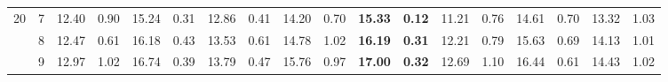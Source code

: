 \documentclass[conference]{IEEEtran}
\begin{document}
\begin{table}[t]
\begin{tabular}{|cc|ll|ll|ll|ll|ll|ll|ll|ll|}
		\multicolumn{1}{|c|}{\multirow{3}{*}{20}} & 7          & \multicolumn{1}{l|}{12.40}         & 0.90                              & \multicolumn{1}{l|}{15.24}          & 0.31                              & \multicolumn{1}{l|}{12.86}         & 0.41                              & \multicolumn{1}{l|}{14.20}         & 0.70                              & \multicolumn{1}{l|}{\textbf{15.33}}       & \textbf{0.12} & \multicolumn{1}{l|}{11.21} & 0.76 & \multicolumn{1}{l|}{14.61}          & 0.70          & \multicolumn{1}{l|}{13.32} & 1.03 \\ \cline{2-18} 
		\multicolumn{1}{|c|}{}                    & 8          & \multicolumn{1}{l|}{12.47}         & 0.61                              & \multicolumn{1}{l|}{16.18}          & 0.43                              & \multicolumn{1}{l|}{13.53}         & 0.61                              & \multicolumn{1}{l|}{14.78}         & 1.02                              & \multicolumn{1}{l|}{\textbf{16.19}}       & \textbf{0.31} & \multicolumn{1}{l|}{12.21} & 0.79 & \multicolumn{1}{l|}{15.63}          & 0.69          & \multicolumn{1}{l|}{14.13} & 1.01 \\ \cline{2-18} 
		\multicolumn{1}{|c|}{}                    & 9          & \multicolumn{1}{l|}{12.97}         & 1.02                              & \multicolumn{1}{l|}{16.74}          & 0.39                              & \multicolumn{1}{l|}{13.79}         & 0.47                              & \multicolumn{1}{l|}{15.76}         & 0.97                              & \multicolumn{1}{l|}{\textbf{17.00}}       & \textbf{0.32} & \multicolumn{1}{l|}{12.69} & 1.10 & \multicolumn{1}{l|}{16.44}          & 0.61          & \multicolumn{1}{l|}{14.43} & 1.02 \\ \hline
	\end{tabular}
\end{table}
\end{document}

